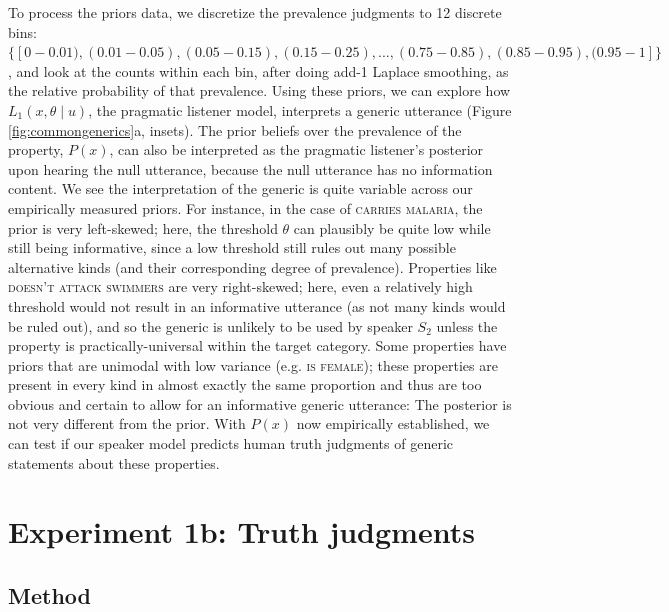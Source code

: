 \documentclass[12pt,letterpaper]{article}
\begin{document}
To process the priors data, we discretize the prevalence judgments to 12 discrete bins: $\{[0-0.01), (0.01-0.05), (0.05-0.15), (0.15-0.25),  ..., (0.75-0.85), (0.85-0.95), (0.95-1]\}$, and look at the counts within each bin, after doing add-1 Laplace smoothing, as the relative probability of that prevalence. 
Using these priors, we can explore how $L_{1}(x , \theta \mid u)$, the pragmatic listener model, interprets a generic utterance (Figure \ref{fig:commongenerics}a, insets). 
The prior beliefs over the prevalence of the property, $P(x)$, can also be interpreted as the pragmatic listener's posterior upon hearing the null utterance, because the null utterance has no information content.
We see the interpretation of the generic is quite variable across our empirically measured priors.
For instance, in the case of \textsc{carries malaria}, the prior is very left-skewed; here, the threshold $\theta$ can plausibly be quite low while still being informative, since a low threshold still rules out many possible alternative kinds (and their corresponding degree of prevalence).
Properties like \textsc{doesn't attack swimmers} are very right-skewed; here, even a relatively high threshold would not result in an informative utterance (as not many kinds would be ruled out), and so the generic is unlikely to be used by speaker $S_2$ unless the property is practically-universal within the target category. 
Some properties have priors that are unimodal with low variance (e.g. \textsc{is female}); these properties are present in every kind in almost exactly the same proportion and thus are too obvious and certain to allow for an informative generic utterance: The posterior is not very different from the prior. 
With $P(x)$ now empirically established, we can test if our speaker model predicts human truth judgments of generic statements about these properties.


\section*{Experiment 1b: Truth judgments}



\subsection*{Method}
\end{document}
